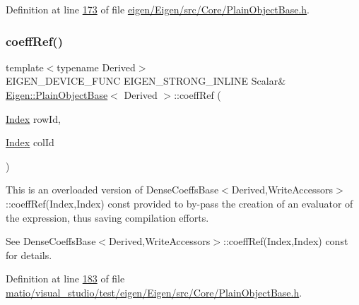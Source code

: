 Definition at line \hyperlink{eigen_2_eigen_2src_2_core_2_plain_object_base_8h_source_l00173}{173} of file \hyperlink{eigen_2_eigen_2src_2_core_2_plain_object_base_8h_source}{eigen/\+Eigen/src/\+Core/\+Plain\+Object\+Base.\+h}.

\mbox{\label{class_eigen_1_1_plain_object_base_a25626a55b26a4323565f79d1b7c48ea8}} 
\subsubsection{\texorpdfstring{coeff\+Ref()}{coeffRef()}\hspace{0.1cm}{\footnotesize\ttfamily [1/8]}}
{\footnotesize\ttfamily template$<$typename Derived$>$ \\
E\+I\+G\+E\+N\+\_\+\+D\+E\+V\+I\+C\+E\+\_\+\+F\+U\+NC E\+I\+G\+E\+N\+\_\+\+S\+T\+R\+O\+N\+G\+\_\+\+I\+N\+L\+I\+NE Scalar\& \hyperlink{class_eigen_1_1_plain_object_base}{Eigen\+::\+Plain\+Object\+Base}$<$ Derived $>$\+::coeff\+Ref (\begin{DoxyParamCaption}\item[{\hyperlink{namespace_eigen_a62e77e0933482dafde8fe197d9a2cfde}{Index}}]{row\+Id,  }\item[{\hyperlink{namespace_eigen_a62e77e0933482dafde8fe197d9a2cfde}{Index}}]{col\+Id }\end{DoxyParamCaption})\hspace{0.3cm}{\ttfamily [inline]}}

This is an overloaded version of Dense\+Coeffs\+Base$<$\+Derived,\+Write\+Accessors$>$\+::coeff\+Ref(\+Index,\+Index) const provided to by-\/pass the creation of an evaluator of the expression, thus saving compilation efforts.

See Dense\+Coeffs\+Base$<$\+Derived,\+Write\+Accessors$>$\+::coeff\+Ref(\+Index,\+Index) const for details. 

Definition at line \hyperlink{matio_2visual__studio_2test_2eigen_2_eigen_2src_2_core_2_plain_object_base_8h_source_l00183}{183} of file \hyperlink{matio_2visual__studio_2test_2eigen_2_eigen_2src_2_core_2_plain_object_base_8h_source}{matio/visual\+\_\+studio/test/eigen/\+Eigen/src/\+Core/\+Plain\+Object\+Base.\+h}.

\mbox{\label{class_eigen_1_1_plain_object_base_a25626a55b26a4323565f79d1b7c48ea8}} 
